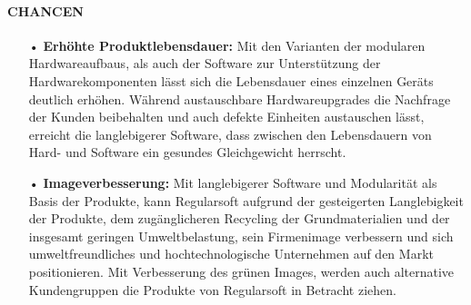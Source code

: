 \documentclass[12pt,titlepage]{article}
\begin{document}
\paragraph{CHANCEN}
\begin{itemize}
\item[•] \textbf{Erhöhte Produktlebensdauer:}
Mit den Varianten der modularen Hardwareaufbaus, als auch der Software zur Unterstützung der Hardwarekomponenten lässt sich die Lebensdauer eines einzelnen Geräts deutlich erhöhen. Während austauschbare Hardwareupgrades die Nachfrage der Kunden beibehalten und auch defekte Einheiten austauschen lässt, erreicht die langlebigerer Software, dass zwischen den Lebensdauern von Hard- und Software ein gesundes Gleichgewicht herrscht.

\item[•] \textbf{Imageverbesserung:}
Mit langlebigerer Software und Modularität als Basis der Produkte, kann Regularsoft aufgrund der gesteigerten Langlebigkeit der Produkte, dem zugänglicheren Recycling der Grundmaterialien und der insgesamt geringen Umweltbelastung, sein Firmenimage verbessern und sich umweltfreundliches und hochtechnologische Unternehmen auf den Markt positionieren. Mit Verbesserung des  grünen Images, werden auch alternative Kundengruppen die Produkte von Regularsoft in Betracht ziehen.
\end{itemize}
\end{document}
